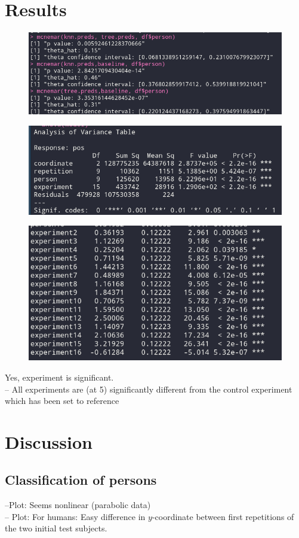 \documentclass[12pt,fleqn]{article}
\begin{document}
\section{Results}
\begin{figure}[H]
	\centering
	\includegraphics[width=.7\linewidth]{mcnemar_results}
\end{figure}
\begin{figure}[H]
\centering
\includegraphics[width=.7\linewidth]{p1_anova}
\end{figure}
\begin{figure}[H]
	\centering
	\includegraphics[width=.7\linewidth]{p1_anova_summay}
\end{figure}


Yes, experiment is significant.\\
	
-- All experiments are (at 5\pro) significantly different from the control experiment which has been set to reference

\section{Discussion}
\subsection{Classification of persons}
--Plot: Seems nonlinear (parabolic data)\\
-- Plot: For humans: Easy difference in \(y\)-coordinate between first repetitions of the two initial test subjects.
\end{document}
